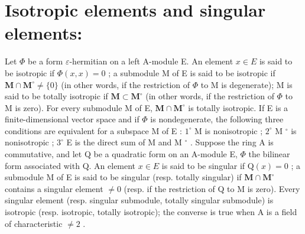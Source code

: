 \section*{Isotropic elements and singular elements:}

Let \(\Phi\) be a form \(\varepsilon\)-hermitian on a left A-module E. An element \(x \in E\) is said to be isotropic if \(\Phi(x, x) = 0\) ; a submodule M of E is said to be isotropic if \(\mathbf{M} \cap \mathbf{M}^{\circ} \neq \{0\}\) (in other words, if the restriction of \(\Phi\) to M is degenerate); M is said to be totally isotropic if \(\mathbf{M} \subset \mathbf{M}^{\circ}\) (in other words, if the restriction of \(\Phi\) to M is zero). For every submodule M of E, \(\mathbf{M} \cap \mathbf{M}^{\circ}\) is totally isotropic. If E is a finite-dimensional vector space and if \(\Phi\) is nondegenerate, the following three conditions are equivalent for a subspace M of E : \(1^{\circ}\) M is nonisotropic ; \(2^{\circ}\) M \(^{\circ}\) is nonisotropic ; \(3^{\circ}\) E is the direct sum of M and M \(^{\circ}\) . Suppose the ring A is commutative, and let Q be a quadratic form on an A-module E, \(\Phi\) the bilinear form associated with Q. An element \(x \in E\) is said to be singular if \(\mathrm{Q}(x) = 0\) ; a submodule M of E is said to be singular (resp. totally singular) if \(\mathbf{M} \cap \mathbf{M}^{\circ}\) contains a singular element \(\neq 0\) (resp. if the restriction of Q to M is zero). Every singular element (resp. singular submodule, totally singular submodule) is isotropic (resp. isotropic, totally isotropic); the converse is true when A is a field of characteristic \(\neq 2\) .
